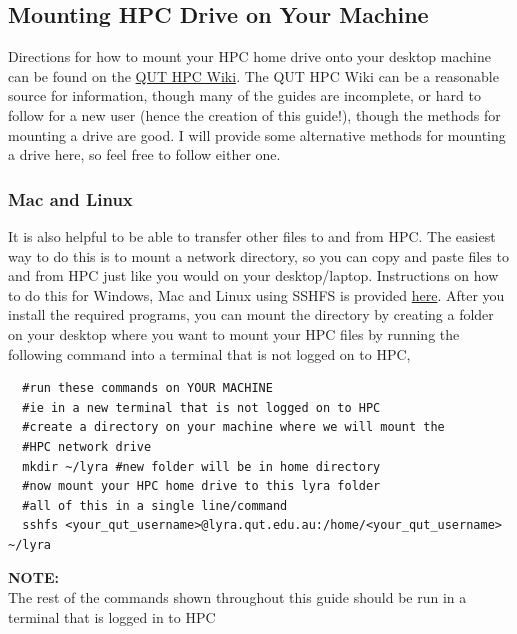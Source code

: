 \subsection{Mounting HPC Drive on Your Machine}
Directions for how to mount your HPC home drive onto your desktop machine can be found on the \href{https://wiki.qut.edu.au/pages/viewpage.action?pageId=244125273}{QUT HPC Wiki}. The QUT HPC Wiki can be a reasonable source for information, though many of the guides are incomplete, or hard to follow for a new user (hence the creation of this guide!), though the methods for mounting a drive are good. I will provide some alternative methods for mounting a drive here, so feel free to follow either one.
%
%
\subsubsection{Mac and Linux}
It is also helpful to be able to transfer other files to and from HPC. The easiest way to do this is to mount a network directory, so you can copy and paste files to and from HPC just like you would on your desktop/laptop. Instructions on how to do this for Windows, Mac and Linux using SSHFS is provided \href{https://www.digitalocean.com/community/tutorials/how-to-use-sshfs-to-mount-remote-file-systems-over-ssh}{here}. After you install the required programs, you can mount the directory by creating a folder on your desktop where you want to mount your HPC files by running the following command into a terminal that is not logged on to HPC,
%
%
\\
\par
\begin{verbatim}
  #run these commands on YOUR MACHINE
  #ie in a new terminal that is not logged on to HPC
  #create a directory on your machine where we will mount the
  #HPC network drive
  mkdir ~/lyra #new folder will be in home directory
  #now mount your HPC home drive to this lyra folder
  #all of this in a single line/command
  sshfs <your_qut_username>@lyra.qut.edu.au:/home/<your_qut_username> ~/lyra
\end{verbatim}
%
%
%
\par
\begin{story}
  \textbf{NOTE:}
  \\
  The rest of the commands shown throughout this guide should be run in a terminal that is logged in to HPC
\end{story}
%
%
